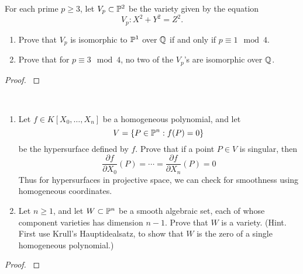 \documentclass[12pt,reqno]{amsart}
\begin{document}
\begin{exe}\label{1.10}
For each prime $p \geq 3$, let $V_p \subset {\mathbb P}^2$ be the variety given by the equation
\[
V_p : X^2+Y^2=Z^2.
\]
\begin{enumerate}
\item
Prove that $V_p$ is isomorphic to ${\mathbb P}^1$ over ${\mathbb Q}$ if and only if $p \equiv 1 \mod 4$.
\item
Prove that for $p \equiv 3 \mod 4$, no two of the $V_p$'s are isomorphic over ${\mathbb Q}$.
\end{enumerate}
\begin{proof}\label{s1.10}

\end{proof} 
\end{exe} 

\begin{exe}\label{1.11}
{\ }
\begin{enumerate}
\item
Let $f\in K[X_0, \hdots, X_n]$ be a homogeneous polynomial, and let
\[
V=\{ P\in {\mathbb P}^n: f(P)=0\}
\]
be the hypersurface defined by $f$.  Prove that if a point $P\in V$ is singular, then
\[
\frac{\partial f}{\partial X_0}(P)=\cdots = \frac{\partial f}{\partial X_n}(P)=0
\]
Thus for hypersurfaces in projective space, we can check for smoothness using homogeneous coordinates.

\item
Let $n \geq 1$, and let $W \subset {\mathbb P}^n$ be a smooth algebraic set, each of whose component varieties has dimension $n-1$.  Prove that $W$ is a variety.  (Hint.  First use Krull's Hauptidealsatz, to show that $W$ is the zero of a single homogeneous polynomial.)


\end{enumerate}
\begin{proof}\label{s1.11}

\end{proof} 
\end{exe} 
\end{document}
